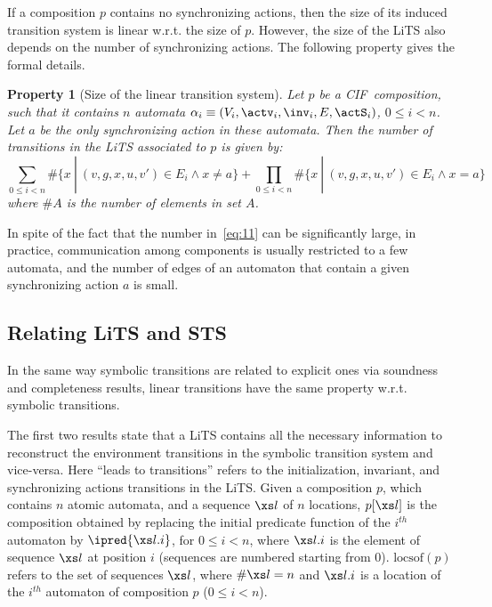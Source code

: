 \documentclass[submission,copyright,creativecommons,sharealike]{eptcs}
\newcommand{\CIF}{{CIF}}
\newtheorem{prop}{Property}
\begin{document}
If a composition $p$ contains no synchronizing actions, then the size
of its induced transition system is linear w.r.t. the size of $p$.
However, the size of the LiTS also depends on the number of
synchronizing actions. The following property gives the formal
details.

\begin{prop}[Size of the linear transition system]
  Let $p$ be a \CIF\ composition, such that it contains $n$ automata
  $\alpha_i \equiv (V_i, \actv_i, \inv_i, E, {\actS}_i)$, $0 \leq i <
  n$. Let $a$ be the only synchronizing action in these automata.
  Then the number of transitions in the LiTS associated to $p$ is
  given by:
  \begin{equation}
    \label{eq:11}
    \displaystyle\sum_{0 \leq i < n} \#\{ x\ |\ (v, g, x, u, v' ) \in
    E_i \wedge x \neq a\} + \displaystyle\prod_{0 \leq i < n} \#\{ x\ |\ (v,
    g, x, u, v' ) \in E_i \wedge x = a\}
  \end{equation}
  where $\#A$ is the number of elements in set $A$.
\end{prop}


In spite of the fact that the number in~\eqref{eq:11} can be
significantly large, in practice, communication among components is
usually restricted to a few automata, and the number of edges of an
automaton that contain a given synchronizing action $a$ is small.



\subsection{Relating LiTS and STS}
\label{sec:relat-lits-sts}

In the same way symbolic transitions are related to explicit ones via
soundness and completeness results, linear transitions have the same
property w.r.t. symbolic transitions.

The first two results state that a LiTS contains all the necessary
information to reconstruct the environment transitions in the
symbolic transition system and vice-versa. Here ``leads
to transitions'' refers to the
initialization, invariant, and synchronizing actions transitions in
the LiTS. Given a composition $p$, which contains $n$ atomic automata,
and a sequence $\xs l$ of $n$ locations, $p[\xs l]$ is the composition
obtained by replacing the initial predicate function of the $i^{th}$
automaton by $\ipred{\xs l {.} i}$, for $0 \leq i < n$, where $\xs l {.} i$ is
the element of sequence $\xs l$ at position $i$ (sequences are
numbered starting from $0$). $\mathrm{locsof}(p)$ refers to the set of
sequences $\xs l$, where $\# \xs l = n$ and $\xs l {.} i$ is a location
of the $i^{th}$ automaton of composition $p$ ($0 \leq i < n$).
\end{document}
